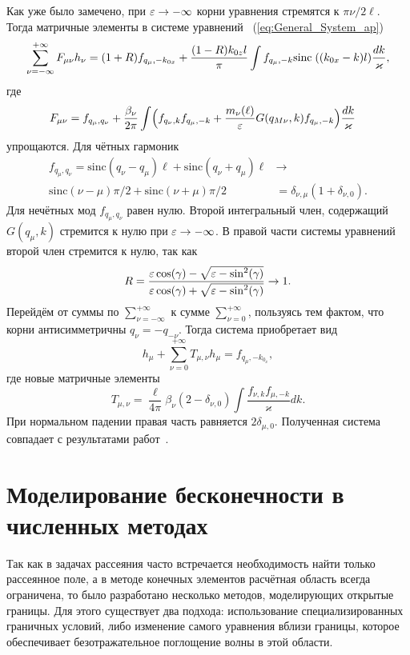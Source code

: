 Как уже было замечено, при $\varepsilon \to -\infty$ корни уравнения стремятся к $\pi \nu/2\ell$. Тогда матричные элементы в системе уравнений ~(\ref{eq:General_System_ap})
\begin{align}
	\sum_{\nu=-\infty}^{+\infty} F_{\mu \nu} h_\nu = (1+R)f_{q_\mu,-k_{0x}} + \frac{(1-R)k_{0z} l}{\pi}\int f_{q_\mu,-k}\mathrm{sinc}\;((k_{0x}-k)l) \frac{dk}{\varkappa}, \label{eq:General_System_ap}
\end{align}
где 
\begin{align}
F_{\mu \nu} &= f_{q_\mu,q_\nu} + \frac{\beta_\nu}{2\pi}\int
\Bigl(f_{q_\nu,k}f_{q_\mu,-k}  + \frac{m_\nu(\ell)}{\varepsilon} G(q_{M\nu},k)f_{q_\mu,-k} \Bigr)\frac{dk}{\varkappa}
\label{eq:F_mn_ap}
\end{align}
упрощаются. Для чётных гармоник 
\begin{align}
    f_{q_\mu,q_\nu} = \text{sinc}(q_\nu - q_\mu)\ell + \text{sinc}(q_\nu +q_\mu)\ell &\to \\
    \text{sinc}(\nu - \mu)\pi/2 + \text{sinc}(\nu +\mu)\pi/2& = \delta_{\nu,\mu}(1 + \delta_{\nu,0}). \nonumber
\end{align}
Для нечётных мод $f_{q_\mu,q_\nu}$ равен нулю. Второй интегральный член, содержащий $G(q_\mu,k)$ стремится к нулю при $\varepsilon \to -\infty$. В правой части системы уравнений второй член стремится к нулю, так как 
$$
R = \frac{\varepsilon \cos(\gamma) - \sqrt{\varepsilon - \sin^2(\gamma)}}{\varepsilon \cos(\gamma) + \sqrt{\varepsilon - \sin^2(\gamma)}}\to 1.
$$
Перейдём от суммы по $\sum_{\nu = -\infty}^{+\infty}$ к сумме $\sum_{\nu = 0}^{+\infty}$, пользуясь тем фактом, что корни антисимметричны $q_\nu = -q_{-\nu}$. Тогда система приобретает вид
\begin{equation}
    h_\mu + \sum_{\nu = 0}^{+\infty}T_{\mu,\nu}h_\mu = f_{q_\mu,-k_{0_x}},
\end{equation}
где новые матричные элементы 
\begin{equation}
    T_{\mu,\nu} = \frac{\ell}{4 \pi}\beta_\nu (2 - \delta_{\nu,0})\int
\frac{f_{\nu,k}f_{\mu,-k}}{\varkappa}dk.
\end{equation}
При нормальном падении правая часть равняется $2 \delta_{\mu,0}$. Полученная система совпадает с результатами работ~\cite{Shapiro16,sturman2010transmission}.
\chapter{Моделирование бесконечности в численных методах}
Так как в задачах рассеяния часто встречается необходимость найти только рассеянное поле, а в методе конечных элементов расчётная область всегда ограничена, то было разработано несколько методов, моделирующих открытые границы. Для этого существует два подхода: использование специализированных граничных условий, либо изменение самого уравнения вблизи границы, которое обеспечивает безотражательное поглощение волны в этой области.

